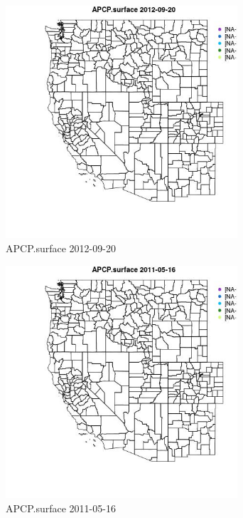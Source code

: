 \begin{figure} 
\centering  
\includegraphics[width=0.77\textwidth]{Code_Outputs/ML_input_report_ML_input_PM25_Step5_part_d_de_duplicated_aves_ML_input_MapObsAPCPsurface2012-09-20.jpg} 
\caption{\label{fig:ML_input_report_ML_input_PM25_Step5_part_d_de_duplicated_aves_ML_inputMapObsAPCPsurface2012-09-20}APCP.surface 2012-09-20} 
\end{figure} 
 

\begin{figure} 
\centering  
\includegraphics[width=0.77\textwidth]{Code_Outputs/ML_input_report_ML_input_PM25_Step5_part_d_de_duplicated_aves_ML_input_MapObsAPCPsurface2011-05-16.jpg} 
\caption{\label{fig:ML_input_report_ML_input_PM25_Step5_part_d_de_duplicated_aves_ML_inputMapObsAPCPsurface2011-05-16}APCP.surface 2011-05-16} 
\end{figure} 
 


